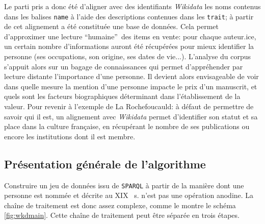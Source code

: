 \documentclass[a4paper, 12pt, twoside]{book}
\newcommand{\scl}[1]{%
	#1%
	\ifthenelse{\equal{#1}{I}}{\up{er}}{\up{ème}}%
	~s.%
}
\newcommand{\sparql}{\texttt{\gls{SPARQL}}}
\newcommand{\tname}{\texttt{name}}
\newcommand{\ttrait}{\texttt{trait}}
\newcommand{\wkd}{\textit{Wikidata}}
\begin{document}
Le parti pris a donc été d'aligner avec des identifiants \wkd{} les noms contenus dans les balises \tname{} à l'aide des descriptions contenues dans les \ttrait{}; à partir de cet alignement a été constituée une base de données. Cela permet d'approximer une lecture \enquote{humaine} des items en vente: pour chaque auteur.ice, un certain nombre d'informations auront été récupérées pour mieux identifier la personne (ses occupations, son origine, ses dates de vie...). L'analyse du corpus s'appuit alors sur un bagage de connaissances qui permet d'appréhender par lecture distante l'importance d'une personne. Il devient alors envisageable de voir dans quelle mesure la mention d'une personne impacte le prix d'un manuscrit, et quels sont les facteurs biographiques déterminant dans l'établissement de la valeur. Pour revenir à l'exemple de La Rochefoucauld: à défaut de permettre de savoir qui il est, un alignement avec \wkd{} permet d'identifier son statut et sa place dans la culture française, en récupérant le nombre de ses publications ou encore les institutions dont il est membre.


\subsection{Présentation générale de l'algorithme}
Construire un jeu de données issu de \sparql{} à partir de la manière dont une personne est nommée et décrite au \scl{XIX} n'est pas une opération anodine. La chaîne de traitement est donc assez complexe, comme le montre le schéma \ref{fig:wkdmain}. Cette chaîne de traitement peut être séparée en trois étapes.
\end{document}
